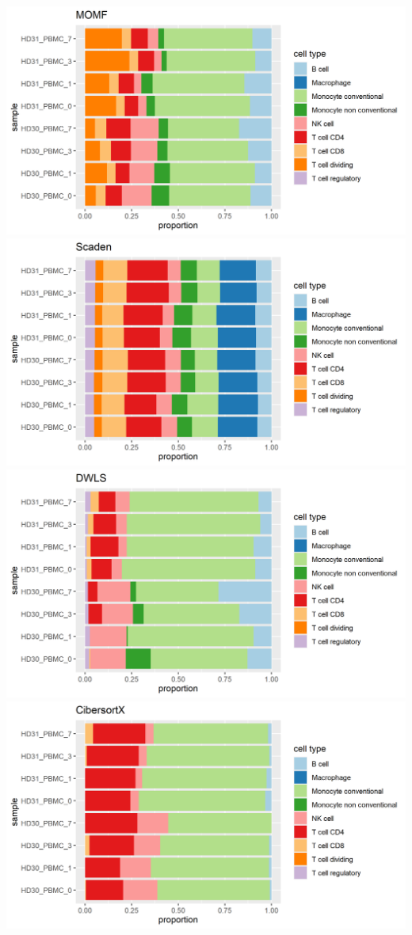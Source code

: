 \documentclass[
]{article}
\begin{document}
\includegraphics[width=0.8\linewidth]{images/momf_prop}
\includegraphics[width=0.8\linewidth]{images/scaden_prop}
\includegraphics[width=0.8\linewidth]{images/dwls_prop}
\includegraphics[width=0.8\linewidth]{images/cibersortx_prop}
\end{document}

